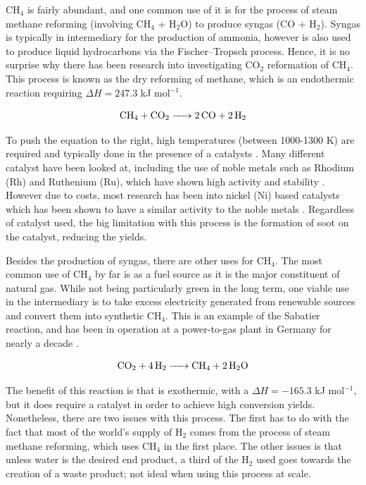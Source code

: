 CH$_4$ is fairly abundant, and one common use of it is for the process of steam methane reforming (involving CH$_4$ + H$_2$O) to produce syngas (CO + H$_2$). Syngas is typically in intermediary for the production of ammonia, however is also used to produce liquid hydrocarbons via the Fischer–Tropsch process. Hence, it is no surprise why there has been research into investigating CO$_2$ reformation of CH$_4$. This process is known as the dry reforming of methane, which is an endothermic reaction requiring $\Delta H  = 247.3$ kJ mol$^{-1}$. 

\begin{equation}
    \ce{CH_4 + CO_2 -> 2CO + 2H_2}
    \label{eq:drm}
\end{equation}

To push the equation to the right, high temperatures (between 1000-1300 K) are required and typically done in the presence of a catalysts \cite{pakhare_spivey_2014}. Many different catalyst have been looked at, including the use of noble metals such as Rhodium (Rh) and Ruthenium (Ru), which have shown high activity and stability \cite{Rezaei2006, Rostrup-Nielsen1993}. However due to costs, most research has been into nickel (Ni) based catalysts which has been shown to have a similar activity to the noble metals \cite{Ma2009}. Regardless of catalyst used, the big limitation with this process is the formation of soot on the catalyst, reducing the yields.

Besides the production of syngas, there are other uses for CH$_4$. The most common use of CH$_4$ by far is as a fuel source as it is the major constituent of natural gas. While not being particularly green in the long term, one viable use in the intermediary is to take excess electricity generated from renewable sources and convert them into synthetic CH$_4$. This is an example of the Sabatier reaction, and has been in operation at a power-to-gas plant in Germany for nearly a decade \cite{etogas}.

\begin{equation}
    \ce{CO_2 + 4H_2 -> CH_4 + 2H_2O}
    \label{eq:sabatier_reaction}
\end{equation}

The benefit of this reaction is that is exothermic, with a $\Delta H = -165.3$ kJ mol$^{-1}$, but it does require a catalyst in order to achieve high conversion yields. Nonetheless, there are two issues with this process. The first has to do with the fact that most of the world's supply of H$_2$ comes from the process of steam methane reforming, which uses CH$_4$ in the first place. The other issues is that unless water is the desired end product, a third of the H$_2$ used goes towards the creation of a waste product; not ideal when using this process at scale. 


